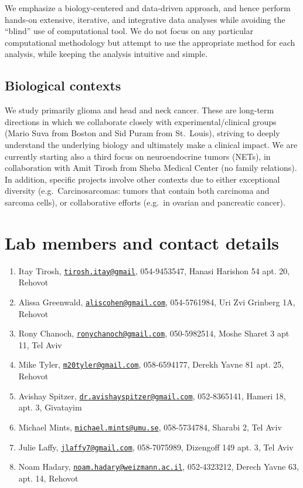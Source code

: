 \documentclass[]{book}
\providecommand{\tightlist}{%
  \setlength{\itemsep}{0pt}\setlength{\parskip}{0pt}}
\begin{document}
We emphasize a biology-centered and data-driven approach, and hence
perform hands-on extensive, iterative, and integrative data analyses
while avoiding the ``blind'' use of computational tool. We do not focus
on any particular computational methodology but attempt to use the
appropriate method for each analysis, while keeping the analysis
intuitive and simple.

\section{Biological contexts}\label{biological-contexts}

We study primarily glioma and head and neck cancer. These are long-term
directions in which we collaborate closely with experimental/clinical
groups (Mario Suva from Boston and Sid Puram from St.~Louis), striving
to deeply understand the underlying biology and ultimately make a
clinical impact. We are currently starting also a third focus on
neuroendocrine tumors (NETs), in collaboration with Amit Tirosh from
Sheba Medical Center (no family relations). In addition, specific
projects involve other contexts due to either exceptional diversity
(e.g.~Carcinosarcomas: tumors that contain both carcinoma and sarcoma
cells), or collaborative efforts (e.g.~in ovarian and pancreatic
cancer).

\chapter{Lab members and contact details}\label{contact}

\begin{enumerate}
\def\labelenumi{\arabic{enumi}.}
\tightlist
\item
  Itay Tirosh,
  \href{mailto:tirosh.itay@gmail}{\nolinkurl{tirosh.itay@gmail}},
  054-9453547, Hanasi Harishon 54 apt. 20, Rehovot
\item
  Alissa Greenwald,
  \href{mailto:aliscohen@gmail.com}{\nolinkurl{aliscohen@gmail.com}},
  054-5761984, Uri Zvi Grinberg 1A, Rehovot
\item
  Rony Chanoch,
  \href{mailto:ronychanoch@gmail.com}{\nolinkurl{ronychanoch@gmail.com}},
  050-5982514, Moshe Sharet 3 apt 11, Tel Aviv
\item
  Mike Tyler,
  \href{mailto:m20tyler@gmail.com}{\nolinkurl{m20tyler@gmail.com}},
  058-6594177, Derekh Yavne 81 apt. 25, Rehovot
\item
  Avishay Spitzer,
  \href{mailto:dr.avishayspitzer@gmail.com}{\nolinkurl{dr.avishayspitzer@gmail.com}},
  052-8365141, Hameri 18, apt. 3, Givatayim
\item
  Michael Mints,
  \href{mailto:michael.mints@umu.se}{\nolinkurl{michael.mints@umu.se}},
  058-5734784, Sharabi 2, Tel Aviv
\item
  Julie Laffy,
  \href{mailto:jlaffy7@gmail.com}{\nolinkurl{jlaffy7@gmail.com}},
  058-7075989, Dizengoff 149 apt. 3, Tel Aviv
\item
  Noam Hadary,
  \href{mailto:noam.hadary@weizmann.ac.il}{\nolinkurl{noam.hadary@weizmann.ac.il}},
  052-4323212, Derech Yavne 63, apt. 14, Rehovot
\end{enumerate}
\end{document}
